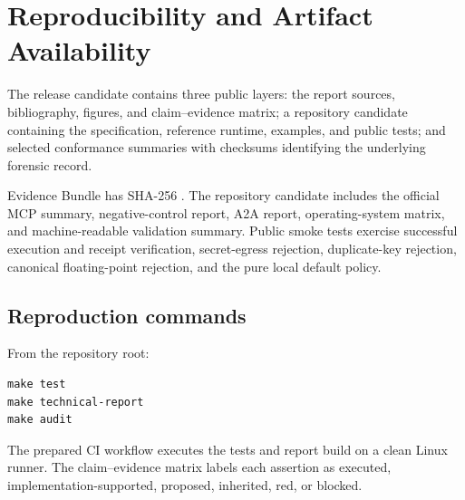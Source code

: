 \section{Reproducibility and Artifact Availability}
\label{sec:artifact}

The release candidate contains three public layers: the report sources, bibliography, figures, and claim--evidence matrix; a repository candidate containing the specification, reference runtime, examples, and public tests; and selected conformance summaries with checksums identifying the underlying forensic record.

Evidence Bundle \evidenceid{} has SHA-256 \evidencehash. The repository candidate includes the official MCP summary, negative-control report, A2A report, operating-system matrix, and machine-readable validation summary. Public smoke tests exercise successful execution and receipt verification, secret-egress rejection, duplicate-key rejection, canonical floating-point rejection, and the pure local default policy.


\subsection{Reproduction commands}
From the repository root:
\begin{lstlisting}
make test
make technical-report
make audit
\end{lstlisting}
The prepared CI workflow executes the tests and report build on a clean Linux runner. The claim--evidence matrix labels each assertion as executed, implementation-supported, proposed, inherited, red, or blocked.
